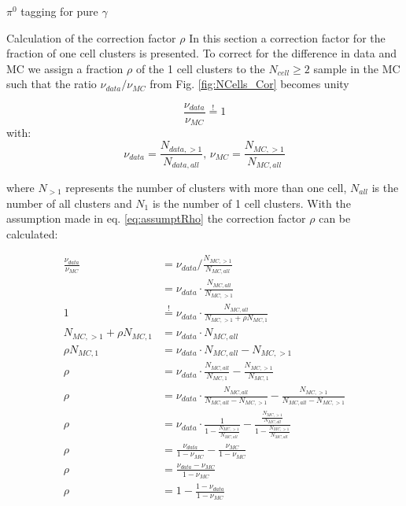 \documentclass[ALICE]{ALICE_analysis_notes}
\newcommand{\PZ}{$\pi^0$\xspace}
\newcommand{\g}{$\gamma$\xspace}
\begin{document}
\begin{section}{\PZ tagging for pure \g}
\begin{section}{Calculation of the correction factor $\rho$}
	In this section a correction factor for the fraction of one cell clusters is presented.
	To correct for the difference in data and MC we assign a fraction $\rho$ of the 1 cell clusters to the $N_{cell} \geq 2$ sample in the MC such that the ratio  $\nu_{data}/\nu_{MC}$ from Fig. \ref{fig:NCells_Cor} becomes unity
	
	\begin{equation}
	\label{eq:assumptRho}
	\frac{\nu_{data}}{\nu_{MC}}\overset{!}{=}1
	\end{equation}
	with:
	\begin{equation}
	\nu_{data}=\frac{N_{data,>1}}{N_{data,all}}\text{, } \nu_{MC}=\frac{N_{MC,>1}}{N_{MC,all}}
	\end{equation}
	
	
	where $N_{>1}$ represents the number of clusters with more than one cell, $N_{all}$ is the number of all clusters and $N_{1}$ is the number of 1 cell clusters. With the assumption made in eq. \ref{eq:assumptRho} the correction factor $\rho$ can be calculated:
	
	
	\begin{align}
	\frac{\nu_{data}}{\nu_{MC}} &= \nu_{data} / \frac{N_{MC, >1}}{N_{MC, all}}  \\ 
	&=\nu_{data} \cdot \frac{N_{MC, all}}{N_{MC, >1}}\\
	1 &\overset{!}{=} \nu_{data} \cdot \frac{N_{MC, all}}{N_{MC, >1} + \rho N_{MC, 1}}\\
	N_{MC, >1} + \rho N_{MC, 1} &= \nu_{data} \cdot N_{MC, all}\\
	\rho N_{MC, 1} &= \nu_{data} \cdot N_{MC, all} - N_{MC, >1}\\
	\rho &= \nu_{data} \cdot \frac{N_{MC, all}}{N_{MC, 1}} - \frac{N_{MC, >1}}{N_{MC, 1}}\\
	\rho &= \nu_{data} \cdot \frac{N_{MC, all}}{N_{MC, all} - N_{MC, >1}} - \frac{N_{MC, >1}}{N_{MC, all} - N_{MC, >1}}\\
	\rho &= \nu_{data} \cdot \frac{1}{ 1 - \frac{N_{MC, >1}}{N_{MC, all}}} - \frac{\frac{N_{MC, >1}}{N_{MC, all}}}{1 - \frac{N_{MC, >1}}{N_{MC, all}}}\\
	\rho &= \frac{\nu_{data}}{1 - \nu_{MC}} - \frac{\nu_{MC}}{1 - \nu_{MC}}\\
	\rho &= \frac{\nu_{data} - \nu_{MC}}{1 - \nu_{MC}}\\
	\rho &= 1 - \frac{ 1 - \nu_{data} }{1 - \nu_{MC}}
	\end{align}
	

\end{section}
\end{section}
\end{document}
